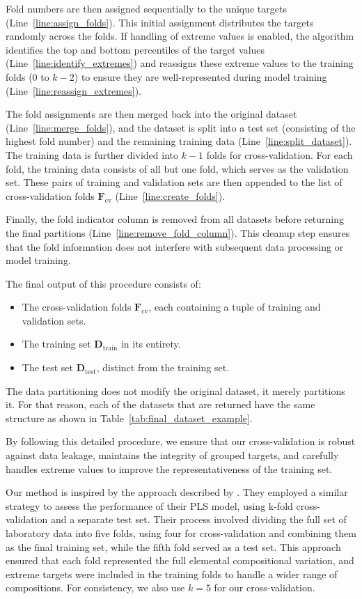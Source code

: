 Fold numbers are then assigned sequentially to the unique targets (Line~\ref{line:assign_folds}).
This initial assignment distributes the targets randomly across the folds.
If handling of extreme values is enabled, the algorithm identifies the top and bottom percentiles of the target values (Line~\ref{line:identify_extremes}) and reassigns these extreme values to the training folds (0 to \( k-2 \)) to ensure they are well-represented during model training (Line~\ref{line:reassign_extremes}).

The fold assignments are then merged back into the original dataset (Line~\ref{line:merge_folds}), and the dataset is split into a test set (consisting of the highest fold number) and the remaining training data (Line~\ref{line:split_dataset}).
The training data is further divided into \( k-1 \) folds for cross-validation.
For each fold, the training data consists of all but one fold, which serves as the validation set.
These pairs of training and validation sets are then appended to the list of cross-validation folds \(\mathbf{F}_\text{cv}\) (Line~\ref{line:create_folds}).

Finally, the fold indicator column is removed from all datasets before returning the final partitions (Line~\ref{line:remove_fold_column}).
This cleanup step ensures that the fold information does not interfere with subsequent data processing or model training.

The final output of this procedure consists of:
\begin{itemize}
    \item The cross-validation folds \(\mathbf{F}_\text{cv}\), each containing a tuple of training and validation sets.
    \item The training set \(\mathbf{D}_\text{train}\) in its entirety.
    \item The test set \(\mathbf{D}_\text{test}\), distinct from the training set.
\end{itemize}

The data partitioning does not modify the original dataset, it merely partitions it.
For that reason, each of the datasets that are returned have the same structure as shown in Table~\ref{tab:final_dataset_example}.

By following this detailed procedure, we ensure that our cross-validation is robust against data leakage, maintains the integrity of grouped targets, and carefully handles extreme values to improve the representativeness of the training set.

Our method is inspired by the approach described by \citet{andersonImprovedAccuracyQuantitative2017}.
They employed a similar strategy to assess the performance of their PLS model, using k-fold cross-validation and a separate test set.
Their process involved dividing the full set of laboratory data into five folds, using four for cross-validation and combining them as the final training set, while the fifth fold served as a test set.
This approach ensured that each fold represented the full elemental compositional variation, and extreme targets were included in the training folds to handle a wider range of compositions.
For consistency, we also use \(k=5\) for our cross-validation.

